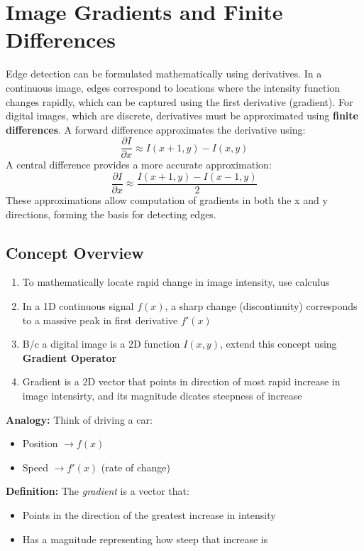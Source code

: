 \documentclass[12pt]{article}
\begin{document}
\section{Image Gradients and Finite Differences}
Edge detection can be formulated mathematically using derivatives. In a continuous image, edges correspond to locations where the intensity function changes rapidly, which can be captured using the first derivative (gradient). For digital images, which are discrete, derivatives must be approximated using \textbf{finite differences}. A forward difference approximates the derivative using:
\[
    \frac{\partial I}{\partial x} \approx I(x+1, y) - I(x, y)
\]
A central difference provides a more accurate approximation:
\[
    \frac{\partial I}{\partial x} \approx \frac{I(x+1, y) - I(x-1, y)}{2}
\]
These approximations allow computation of gradients in both the x and y directions, forming the basis for detecting edges.

\subsection{Concept Overview}
\begin{enumerate}
    \item To mathematically locate rapid change in image intensity, use calculus
    \item In a 1D continuous signal $f(x)$, a sharp change (discontinuity) corresponds to a massive peak in first derivative $f'(x)$
    \item B/c a digital image is a 2D function $I(x,y)$, extend this concept using \textbf{Gradient Operator}
    \item Gradient is a 2D vector that points in direction of most rapid increase in image intensirty, and its magnitude dicates steepness of increase
\end{enumerate}

\textbf{Analogy:} Think of driving a car:
\begin{itemize}
    \item Position $\rightarrow f(x)$
    \item Speed $\rightarrow f'(x)$ (rate of change)
\end{itemize}

\textbf{Definition:} The \textit{gradient} is a vector that:
\begin{itemize}
    \item Points in the direction of the greatest increase in intensity
    \item Has a magnitude representing how steep that increase is
\end{itemize}
\end{document}
